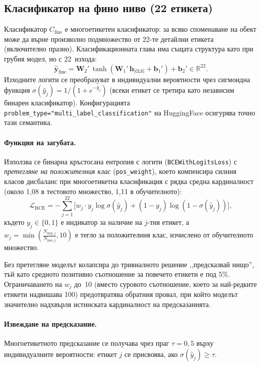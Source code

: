 \documentclass[12pt,a4paper]{report}
\begin{document}
\subsection{Класификатор на фино ниво (22 етикета)}

Класификатор $C_{\text{fine}}$ е многоетикетен класификатор: за всяко споменаване на обект може да върне произволно подмножество от 22-те детайлни етикета (включително празно). Класификационната глава има същата структура като при грубия модел, но с 22~изхода:
\begin{equation}
  \hat{\mathbf{y}}_{\text{fine}} = \mathbf{W}_2' \, \tanh(\mathbf{W}_1' \, \mathbf{h}_{\texttt{[CLS]}} + \mathbf{b}_1') + \mathbf{b}_2' \in \mathbb{R}^{22}.
  \label{eq:classifier_head_fine}
\end{equation}
Изходните логити се преобразуват в индивидуални вероятности чрез сигмоидна функция $\sigma(\hat{y}_j) = 1 / (1 + e^{-\hat{y}_j})$ (всеки етикет се третира като независим бинарен класификатор). Конфигурацията \texttt{problem\_type="multi\_label\_classification"} на HuggingFace осигурява точно тази семантика.

\paragraph{Функция на загубата.} Използва се бинарна кръстосана ентропия с логити (\texttt{BCEWithLogitsLoss}) с \emph{претегляне на положителния клас} (\texttt{pos\_weight}), което компенсира силния класов дисбаланс при многоетикетна класификация с рядка средна кардиналност (около 1,08 в тестовото множество, 1,11 в обучителното):
\begin{equation}
  \mathcal{L}_{\text{BCE}} = -\sum_{j=1}^{22} \Big[ w_j \cdot y_j \log \sigma(\hat{y}_j) + (1 - y_j) \log(1 - \sigma(\hat{y}_j)) \Big],
  \label{eq:bce_loss}
\end{equation}
където $y_j \in \{0,1\}$ е индикатор за наличие на $j$-тия етикет, а $w_j = \min\!\left( \frac{N_{\text{neg},j}}{N_{\text{pos},j}}, 10 \right)$ е тегло за положителния клас, изчислено от обучителното множество.

Без претегляне моделът колапсира до тривиалното решение ,,предсказвай нищо'', тъй като средното позитивно съотношение за повечето етикети е под 5\%. Ограничаването на $w_j$ до~10 (вместо суровото съотношение, което за най-редките етикети надвишава 100) предотвратява обратния провал, при който моделът значително надхвърля истинската кардиналност на предсказанията.

\paragraph{Извеждане на предсказание.} Многоетикетното предсказание се получава чрез праг $\tau = 0{,}5$ върху индивидуалните вероятности: етикет $j$ се присвоява, ако $\sigma(\hat{y}_j) \geq \tau$.
\end{document}

